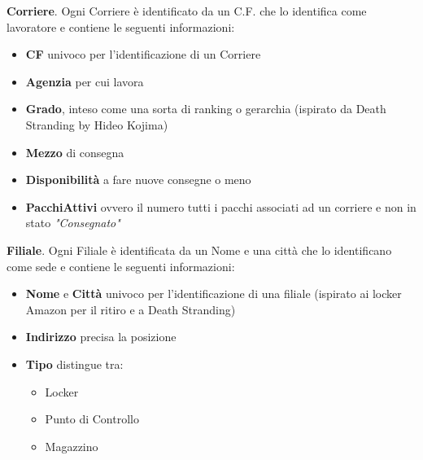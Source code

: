 \textbf{Corriere}. Ogni Corriere è identificato da un C.F. che lo identifica come lavoratore e contiene le seguenti informazioni:
\begin{itemize}
    \setlength{\itemindent}{+.5in}
    \item \textbf{CF} univoco per l'identificazione di un Corriere
    \item \textbf{Agenzia} per cui lavora
    \item \textbf{Grado}, inteso come una sorta di ranking o gerarchia \footnotesize{(ispirato da Death Stranding by  Hideo Kojima)}
    \item \normalsize{\textbf{Mezzo}} di consegna 
    \item \normalsize{\textbf{Disponibilità}} a fare nuove consegne o meno
    \item \textbf{PacchiAttivi} ovvero il numero tutti i pacchi associati ad un corriere e non in stato \textit{"Consegnato"}
\end{itemize}


\textbf{Filiale}. Ogni Filiale è identificata da un Nome e una città che lo identificano come sede e contiene le seguenti informazioni:
\begin{itemize}
    \setlength{\itemindent}{+.5in}
    \item \textbf{Nome} e \textbf{Città} univoco per l'identificazione di una filiale \footnotesize{(ispirato ai locker Amazon per il ritiro e a Death Stranding)}
    \item \textbf{Indirizzo} precisa la posizione
    \item \textbf{Tipo} distingue tra:
     \begin{itemize}
            \setlength{\itemindent}{+.5in}
            \item Locker
            \item Punto di Controllo
            \item Magazzino
        \end{itemize}
\end{itemize}

